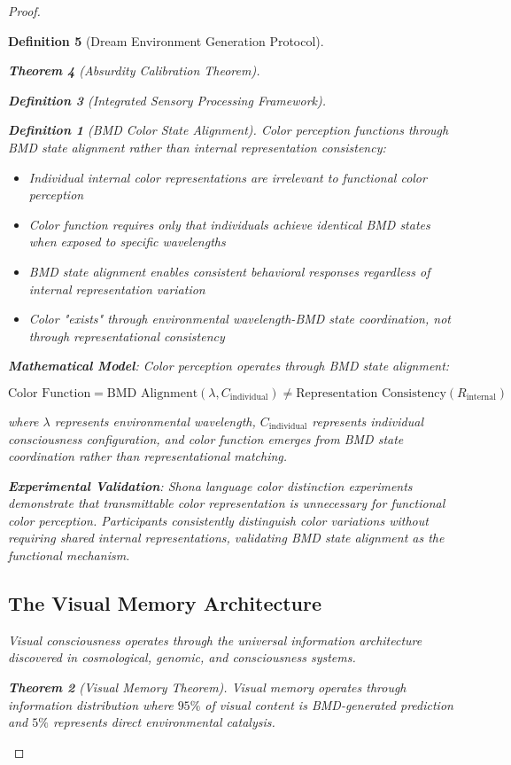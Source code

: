 \documentclass[12pt,a4paper]{article}
\newtheorem{theorem}{Theorem}[section]
\newtheorem{definition}[theorem]{Definition}
\begin{document}
\begin{proof}
\begin{definition}[Dream Environment Generation Protocol]
\begin{theorem}[Absurdity Calibration Theorem]
\begin{observation}
\begin{definition}[Integrated Sensory Processing Framework]
\begin{definition}[BMD Color State Alignment]
Color perception functions through BMD state alignment rather than internal representation consistency:
\begin{itemize}
\item Individual internal color representations are irrelevant to functional color perception
\item Color function requires only that individuals achieve identical BMD states when exposed to specific wavelengths
\item BMD state alignment enables consistent behavioral responses regardless of internal representation variation
\item Color "exists" through environmental wavelength-BMD state coordination, not through representational consistency
\end{itemize}
\end{definition}

\textbf{Mathematical Model}:
Color perception operates through BMD state alignment:

$$\text{Color Function} = \text{BMD Alignment}(\lambda, C_{\text{individual}}) \neq \text{Representation Consistency}(R_{\text{internal}})$$

where $\lambda$ represents environmental wavelength, $C_{\text{individual}}$ represents individual consciousness configuration, and color function emerges from BMD state coordination rather than representational matching.

\textbf{Experimental Validation}:
Shona language color distinction experiments demonstrate that transmittable color representation is unnecessary for functional color perception. Participants consistently distinguish color variations without requiring shared internal representations, validating BMD state alignment as the functional mechanism.

\subsection{The  Visual Memory Architecture}

Visual consciousness operates through the universal  information architecture discovered in cosmological, genomic, and consciousness systems.

\begin{theorem}[Visual Memory  Theorem]
Visual memory operates through  information distribution where $95\%$ of visual content is BMD-generated prediction and $5\%$ represents direct environmental catalysis.
\end{theorem}


\end{definition}
\end{observation}
\end{theorem}
\end{definition}
\end{proof}
\end{document}
